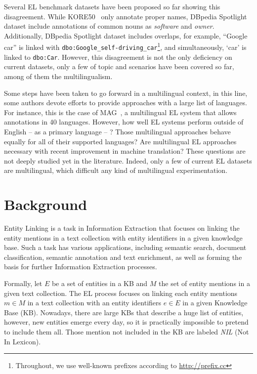 \documentclass[sigconf]{acmart}
\begin{document}
Several EL benchmark datasets have been proposed so far showing this disagreement. While KORE50~\cite{HoffartSNTW12} only annotate proper names, DBpedia Spotlight dataset include annotations of common nouns as \textit{software} and \textit{owner}. Additionally, DBpedia Spotlight dataset includes overlaps, for example, ``Google car'' is linked with \texttt{dbo:Google\_self-driving\_car}\footnote{Throughout, we use well-known prefixes according to \url{http://prefix.cc}}, and simultaneously, `car' is linked to \texttt{dbo:Car}. However, this disagreement is not the only deficiency on current datasets, only a few of topic and scenarios have been covered so far, among of them the multilingualism. 

Some steps have been taken to go forward in a multilingual context, in this line, some authors devote efforts to provide approaches with a large list of languages. For instance, this is the case of MAG~\cite{MoussallemURN18}, a multilingual EL system that allows annotations in 40 languages. However, how well EL systems perform outside of English -- as a primary language -- ? Those multilingual approaches behave equally for all of their supported languages? Are multilingual EL approaches necessary with recent improvement in machine translation? These questions are not deeply studied yet in the literature. Indeed, only a few of current EL datasets are multilingual, which difficult any kind of multilingual experimentation. 



\section{Background}
Entity Linking is a task in Information Extraction that focuses on linking the entity mentions in a text collection with entity identifiers in a given knowledge base. Such a task has various applications, including semantic search, document classification, semantic annotation and text enrichment, as well as forming the basis for further Information Extraction processes. 

Formally, let $E$ be a set of entities in a KB and $M$ the set of entity mentions in a given text collection. The EL process focuses on linking each entity mentions $m\in{}M$ in a text collection with an entity identifiers $e\in{}E$ in a given Knowledge Base (KB). Nowadays, there are large KBs that describe a huge list of entities, however, new entities emerge every day, so it is practically impossible to pretend to include them all. Those mention not included in the KB are labeled \textit{NIL} (Not In Lexicon).
\end{document}
